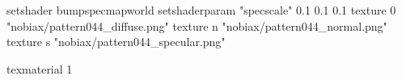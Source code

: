 setshader bumpspecmapworld
setshaderparam "specscale" 0.1 0.1 0.1
   texture 0 "nobiax/pattern044_diffuse.png"
   texture n "nobiax/pattern044_normal.png"
   texture s "nobiax/pattern044_specular.png"

texmaterial 1
